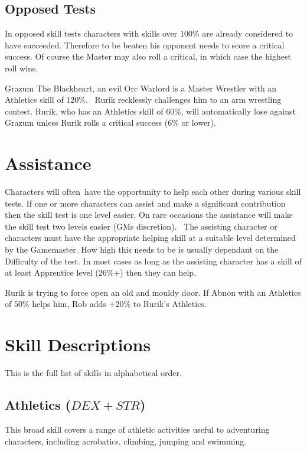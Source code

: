\subsection{Opposed Tests}
In opposed skill tests characters with skills over 100\% are already considered to have succeeded. Therefore to be beaten his opponent needs to score a critical success. Of course the Master may also roll a critical, in which case the highest roll wins.


\begin{rpg-examplebox}
Grazum The Blackheart, an evil Orc Warlord is a Master Wrestler with an Athletics skill of 120\%.  Rurik recklessly challenges him to an arm wrestling contest. Rurik, who has an Athletics skill of 60\%, will automatically lose against Grazum unless Rurik rolls a critical success (6\% or lower).
\end{rpg-examplebox}

\section{Assistance}
Characters will often have the opportunity to help each other during various skill tests. If one or more characters can assist and make a significant contribution then the skill test is one level easier. On rare occasions the assistance will make the skill test two levels easier (GMs discretion).  The assisting character or characters must have the appropriate helping skill at a suitable level determined by the Gamemaster. How high this needs to be is usually dependant on the Difficulty of the test. In most cases as long as the assisting character has a skill of at least Apprentice level (26\%+) then they can help.

\begin{rpg-examplebox}
Rurik is trying to force open an old and mouldy door. If Abnon with an Athletics of 50\% helps him, Rob adds +20\% to Rurik’s Athletics.
\end{rpg-examplebox}


\section{Skill Descriptions}
This is the full list of skills in alphabetical order.

\subsection{Athletics ($DEX+STR$)}
This broad skill covers a range of athletic activities useful to adventuring characters, including acrobatics, climbing, jumping and swimming. 

